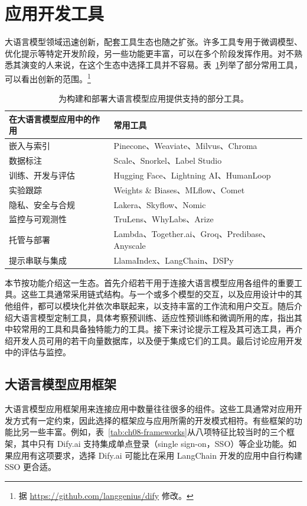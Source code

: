\section{应用开发工具}
\label{sec:ch08-tooling}
大语言模型领域迅速创新，配套工具生态也随之扩张。许多工具专用于微调模型、优化提示等特定开发阶段，另一些功能更丰富，可以在多个阶段发挥作用。对不熟悉其演变的人来说，在这个生态中选择工具并不容易。表~\ref{tab:ch08-tools}列举了部分常用工具，可以看出创新的范围。\footnote{据 \url{https://github.com/langgenius/dify} 修改。}

\begin{table}[htbp]
\centering\small
\caption{为构建和部署大语言模型应用提供支持的部分工具。}
\label{tab:ch08-tools}
\begin{tabularx}{\linewidth}{@{}p{36mm}>{\raggedright\arraybackslash}X@{}}
\toprule
在大语言模型应用中的作用 & 常用工具\\
\midrule
嵌入与索引 & Pinecone、Weaviate、Milvus、Chroma\\
数据标注 & Scale、Snorkel、Label Studio\\
训练、开发与评估 & Hugging Face、Lightning AI、HumanLoop\\
实验跟踪 & Weights \& Biases、MLflow、Comet\\
隐私、安全与合规 & Lakera、Skyflow、Nomic\\
监控与可观测性 & TruLens、WhyLabs、Arize\\
托管与部署 & Lambda、Together.ai、Groq、Predibase、Anyscale\\
提示串联与集成 & LlamaIndex、LangChain、DSPy\\
\bottomrule
\end{tabularx}
\end{table}

本节按功能介绍这一生态。首先介绍若干用于连接大语言模型应用各组件的重要工具。这些工具通常采用链式结构。与一个或多个模型的交互，以及应用设计中的其他组件，都可以模块化并依次串联起来，以支持丰富的工作流和用户交互。随后介绍大语言模型定制工具，具体考察预训练、适应性预训练和微调所用的库，指出其中较常用的工具和具备独特能力的工具。接下来讨论提示工程及其可选工具，再介绍开发人员可用的若干向量数据库，以及便于集成它们的工具。最后讨论应用开发中的评估与监控。

\subsection{大语言模型应用框架}
\label{sec:ch08-frameworks}
大语言模型应用框架用来连接应用中数量往往很多的组件。这些工具通常对应用开发方式有一定约束，因此选择的框架应与应用所需的开发模式相符。有些框架的功能比另一些丰富。例如，表~\ref{tab:ch08-frameworks}从八项特征比较当时的三个框架，其中只有 Dify.ai 支持集成单点登录（single sign-on，SSO）等企业功能。如果应用有这项要求，选择 Dify.ai 可能比在采用 LangChain 开发的应用中自行构建 SSO 更合适。


